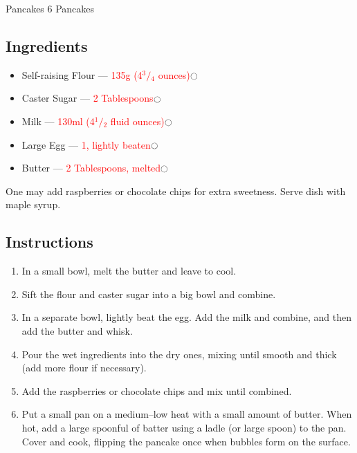 \documentclass[12pt]{article}%
\newcommand{\tick}{\dotfill\(\ocircle\)}
\newcommand{\blue}[1]{\textcolor{blue!70!white}{#1}}
\newcommand{\red}[1]{\textcolor{red}{#1}}
\newcommand{\quant}[1]{\red{#1}\tick}
\begin{document}
\vspace*{\baselineskip}

{\LARGE \blue{Pancakes} \hfill\normalsize 6 Pancakes}

\vspace{-\baselineskip}\hrulefill

\subsection*{Ingredients}

\begin{itemize}[nolistsep]
    \item Self-raising Flour --- \quant{135g (4\(^{3}\!/\!_{4}\) ounces)}
    \item Caster Sugar --- \quant{2 Tablespoons}
    \item Milk --- \quant{130ml (4\(^{1}\!/\!_{2}\) fluid ounces)}
    \item Large Egg --- \quant{1, lightly beaten}
    \item Butter --- \quant{2 Tablespoons, melted}
\end{itemize}

One may add \blue{raspberries} or \blue{chocolate chips} for extra sweetness. Serve dish with maple syrup.

\subsection*{Instructions}

\begin{enumerate}
    \item In a small bowl, melt the \blue{butter} and leave to cool.
    \item Sift the \blue{flour} and \blue{caster sugar} into a big bowl and combine.
    \item In a separate bowl, lightly beat the \blue{egg}. Add the \blue{milk} and combine, and then add the butter and whisk.
    \item Pour the wet ingredients into the dry ones, mixing until smooth and thick (add more flour if necessary).
    \item Add the \blue{raspberries} or \blue{chocolate chips} and mix until combined.
    \item Put a small pan on a medium--low heat with a small amount of butter. When hot, add a large spoonful of batter using a ladle (or large spoon) to the pan. Cover and cook, flipping the pancake once when bubbles form on the surface.
\end{enumerate}
\end{document}

